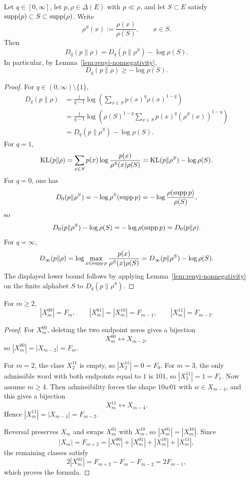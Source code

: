 \begin{proposition}
\label{prop:renyi-support-conditioning}
Let \(q\in[0,\infty]\), let \(p,\rho\in\Delta(E)\) with \(p\ll\rho\), and let
\(S\subset E\) satisfy \(\operatorname{supp}(p)\subset S\subset\operatorname{supp}(\rho)\). Write
\[
\rho^S(x):=\frac{\rho(x)}{\rho(S)},\qquad x\in S.
\]
Then
\[
D_q(p\|\rho)=D_q(p\|\rho^S)-\log \rho(S).
\]
In particular, by Lemma~\ref{lem:renyi-nonnegativity},
\[
D_q(p\|\rho)\ge -\log\rho(S).
\]
\end{proposition}

\begin{proof}
For \(q\in(0,\infty)\setminus\{1\}\),
\[
\begin{aligned}
D_q(p\|\rho)
&=
\frac{1}{q-1}\log\!\left(\sum_{x\in S}p(x)^q\rho(x)^{1-q}\right)\\
&=
\frac{1}{q-1}
\log\!\left(\rho(S)^{1-q}\sum_{x\in S}p(x)^q(\rho^S(x))^{1-q}\right)\\
&=
D_q(p\|\rho^S)-\log\rho(S).
\end{aligned}
\]
For \(q=1\),
\[
\operatorname{KL}(p\|\rho)
=
\sum_{x\in S}p(x)\log\frac{p(x)}{\rho^S(x)\rho(S)}
=
\operatorname{KL}(p\|\rho^S)-\log\rho(S).
\]
For \(q=0\), one has
\[
D_0(p\|\rho^S)=-\log \rho^S(\operatorname{supp} p)
=
-\log\frac{\rho(\operatorname{supp} p)}{\rho(S)},
\]
so
\[
D_0(p\|\rho^S)-\log\rho(S)=-\log\rho(\operatorname{supp} p)=D_0(p\|\rho).
\]
For \(q=\infty\),
\[
D_\infty(p\|\rho)
=
\log\max_{x\in\operatorname{supp} p}\frac{p(x)}{\rho^S(x)\rho(S)}
=
D_\infty(p\|\rho^S)-\log\rho(S).
\]
The displayed lower bound follows by applying
Lemma~\ref{lem:renyi-nonnegativity} on the finite alphabet \(S\) to
\(D_q(p\|\rho^S)\).
\end{proof}

\begin{lemma}\label{lem:endpoint-class-counts}
For \(m\ge2\),
\[
|X_m^{00}|=F_m,\qquad
|X_m^{01}|=|X_m^{10}|=F_{m-1},\qquad
|X_m^{11}|=F_{m-2}.
\]
\end{lemma}

\begin{proof}
For \(X_m^{00}\), deleting the two endpoint zeros gives a bijection
\[
X_m^{00}\longleftrightarrow X_{m-2},
\]
so \(|X_m^{00}|=|X_{m-2}|=F_m\).

For \(m=2\), the class \(X_2^{11}\) is empty, so \(|X_2^{11}|=0=F_0\). For
\(m=3\), the only admissible word with both endpoints equal to \(1\) is
\(101\), so \(|X_3^{11}|=1=F_1\). Now assume \(m\ge4\). Then admissibility
forces the shape \(10w01\) with
\(w\in X_{m-4}\), and this gives a bijection
\[
X_m^{11}\longleftrightarrow X_{m-4}.
\]
Hence \(|X_m^{11}|=|X_{m-4}|=F_{m-2}\).

Reversal preserves \(X_m\) and swaps \(X_m^{01}\) with \(X_m^{10}\), so
\(|X_m^{01}|=|X_m^{10}|\). Since
\[
|X_m|=F_{m+2}
=
|X_m^{00}|+|X_m^{01}|+|X_m^{10}|+|X_m^{11}|,
\]
the remaining classes satisfy
\[
2|X_m^{01}|
=
F_{m+2}-F_m-F_{m-2}
=
2F_{m-1},
\]
which proves the formula.
\end{proof}

